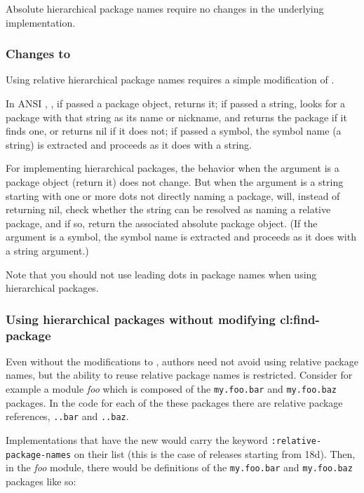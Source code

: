 Absolute hierarchical package names require no changes in the
underlying \clisp{} implementation.


\subsubsection{Changes to }

Using relative hierarchical package names requires a simple
modification of .

In ANSI \clisp{}, , if passed a package object,
returns it; if passed a string,  looks for a
package with that string as its name or nickname, and returns the
package if it finds one, or returns nil if it does not; if passed a
symbol, the symbol name (a string) is extracted and
 proceeds as it does with a string.

For implementing hierarchical packages, the behavior when the argument
is a package object (return it) does not change. But when the argument
is a string starting with one or more dots not directly naming a
package,  will, instead of returning nil, check
whether the string can be resolved as naming a relative package, and
if so, return the associated absolute package object. (If the argument
is a symbol, the symbol name is extracted and 
proceeds as it does with a string argument.)

Note that you should not use leading dots in package names when using
hierarchical packages.

\subsubsection{Using hierarchical packages without modifying cl:find-package}

Even without the modifications to , authors need
not avoid using relative package names, but the ability to reuse
relative package names is restricted. Consider for example a module
\textit{foo} which is composed of the \verb|my.foo.bar| and
\verb|my.foo.baz| packages. In the code for each of the these packages
there are relative package references, \verb|..bar| and \verb|..baz|.

Implementations that have the new  would carry
the keyword \verb|:relative-package-names| on their 
list (this is the case of \cmucl{} releases starting from 18d). Then,
in the \textit{foo} module, there would be definitions of the
\verb|my.foo.bar| and \verb|my.foo.baz| packages like so:

